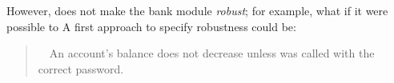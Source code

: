 However, \Scorrect does not make the   bank module 
 \emph{robust}; for example, what  
 if it were possible to 
 A first approach to specify robustness could be:
 

\begin{quote}
\SrobustA\ \ An account's balance does not decrease unless  was called 
with the correct password.
\end{quote}

